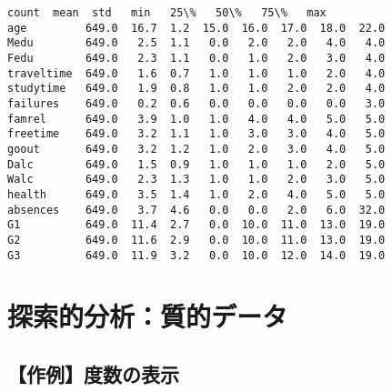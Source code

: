 \documentclass[9pt]{ltjsarticle}
\begin{document}
    
    \begin{Verbatim}[commandchars=\\\{\}]
            count  mean  std   min   25\%   50\%   75\%   max
age         649.0  16.7  1.2  15.0  16.0  17.0  18.0  22.0
Medu        649.0   2.5  1.1   0.0   2.0   2.0   4.0   4.0
Fedu        649.0   2.3  1.1   0.0   1.0   2.0   3.0   4.0
traveltime  649.0   1.6  0.7   1.0   1.0   1.0   2.0   4.0
studytime   649.0   1.9  0.8   1.0   1.0   2.0   2.0   4.0
failures    649.0   0.2  0.6   0.0   0.0   0.0   0.0   3.0
famrel      649.0   3.9  1.0   1.0   4.0   4.0   5.0   5.0
freetime    649.0   3.2  1.1   1.0   3.0   3.0   4.0   5.0
goout       649.0   3.2  1.2   1.0   2.0   3.0   4.0   5.0
Dalc        649.0   1.5  0.9   1.0   1.0   1.0   2.0   5.0
Walc        649.0   2.3  1.3   1.0   1.0   2.0   3.0   5.0
health      649.0   3.5  1.4   1.0   2.0   4.0   5.0   5.0
absences    649.0   3.7  4.6   0.0   0.0   2.0   6.0  32.0
G1          649.0  11.4  2.7   0.0  10.0  11.0  13.0  19.0
G2          649.0  11.6  2.9   0.0  10.0  11.0  13.0  19.0
G3          649.0  11.9  3.2   0.0  10.0  12.0  14.0  19.0
    \end{Verbatim}

    \newpage
    \hypertarget{ux63a2ux7d22ux7684ux5206ux6790ux8ceaux7684ux30c7ux30fcux30bf}{%
\section{探索的分析：質的データ}\label{ux63a2ux7d22ux7684ux5206ux6790ux8ceaux7684ux30c7ux30fcux30bf}}

    \hypertarget{ux4f5cux4f8bux5ea6ux6570ux306eux8868ux793a}{%
\subsection{【作例】度数の表示}\label{ux4f5cux4f8bux5ea6ux6570ux306eux8868ux793a}}
\end{document}
